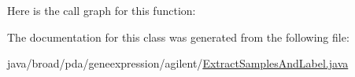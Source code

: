Here is the call graph for this function\+:




The documentation for this class was generated from the following file\+:\begin{DoxyCompactItemize}
\item 
java/broad/pda/geneexpression/agilent/\hyperlink{_extract_samples_and_label_8java}{Extract\+Samples\+And\+Label.\+java}\end{DoxyCompactItemize}
